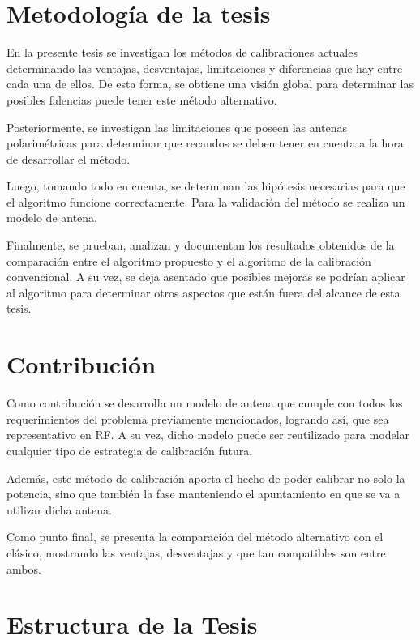 \section{Metodología de la tesis} \label{sc:methodology}

En la presente tesis se investigan los métodos de calibraciones actuales determinando las ventajas, desventajas,
limitaciones y diferencias que hay entre cada una de ellos. De esta forma, se obtiene una visión global para
determinar las posibles falencias puede tener este método alternativo.

Posteriormente, se investigan las limitaciones que poseen las antenas polarimétricas para determinar que recaudos
se deben tener en cuenta a la hora de desarrollar el método.

Luego, tomando todo en cuenta, se determinan las hipótesis necesarias para que el algoritmo funcione correctamente. Para
la validación del método se realiza un modelo de antena.

Finalmente, se prueban, analizan y documentan los resultados obtenidos de la comparación entre el algoritmo propuesto
y el algoritmo de la calibración convencional. A su vez, se deja asentado que posibles mejoras se podrían aplicar al
algoritmo para determinar otros aspectos que están fuera del alcance de esta tesis.

\section{Contribución} \label{sc:contribution}

Como contribución se desarrolla un modelo de antena que cumple con todos los requerimientos del problema previamente
mencionados, logrando así, que sea representativo en RF. A su vez, dicho modelo puede ser reutilizado para modelar cualquier 
tipo de estrategia de calibración futura.

Además, este método de calibración aporta el hecho de poder calibrar no solo la potencia, sino que también la fase
manteniendo el apuntamiento en que se va a utilizar dicha antena.

Como punto final, se presenta la comparación del método alternativo con el clásico, mostrando las ventajas, desventajas y que
tan compatibles son entre ambos.


\section{Estructura de la Tesis} \label{sc:structure}

